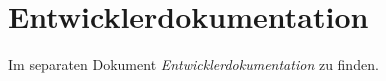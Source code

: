 \chapter{Entwicklerdokumentation}
\label{ch:5}
Im separaten Dokument \textit{Entwicklerdokumentation} zu finden.

